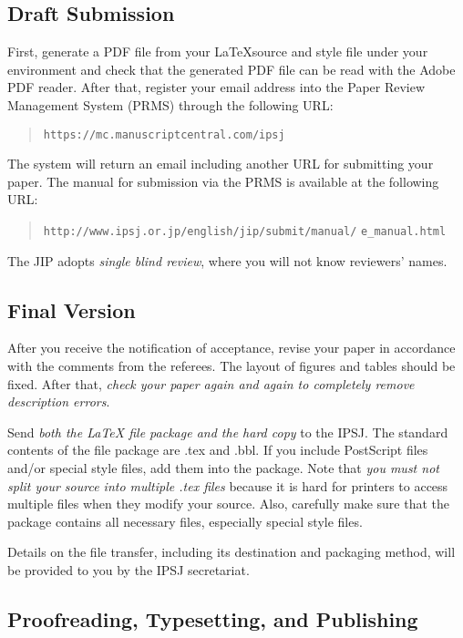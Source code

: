 \documentclass[Japanese,preprint,JIP]{ipsj}
\def\|{\verb|}
\begin{document}


%2.2
\subsection{Draft Submission}

First, generate a PDF file from your \LaTeX source and style file under
your {\LaTeXe} environment and check that the generated PDF file can be
read with the Adobe PDF reader.  After that, register your email address
into the Paper Review Management System (PRMS) through the following
URL:
\begin{quote}
 \small
 \|https://mc.manuscriptcentral.com/ipsj|
\end{quote}

\noindent
The system will return an email including another URL for submitting
your paper. The manual for submission via the PRMS is available at the
following URL: 
\begin{quote}
 \small
 \|http://www.ipsj.or.jp/english/jip/submit/manual/|
 \|e_manual.html|
\end{quote}

The JIP adopts \textit{single blind review}, 
where you will not know reviewers' names.


\subsection{Final Version}

After you receive the notification of acceptance, revise your paper in
accordance with the comments from the referees.
The layout of
figures and tables should be fixed. After that, \textit{check your paper
again and again to completely remove description errors}.

Send \textit{both the {\LaTeX} file package and the hard copy} to the
IPSJ\@. The standard contents of the file package are .tex and .bbl. If
you include PostScript files and/or special style files, add them into
the package. Note that \textit{you must not split your source into
multiple .tex files} because it is hard for printers to access multiple
files when they modify your source. Also, carefully make sure that the
package contains all necessary files, especially special style files.

Details on the file transfer, including its destination and packaging
method, will be provided to you by the IPSJ secretariat.

\subsection{Proofreading, Typesetting, and Publishing}
\end{document}
